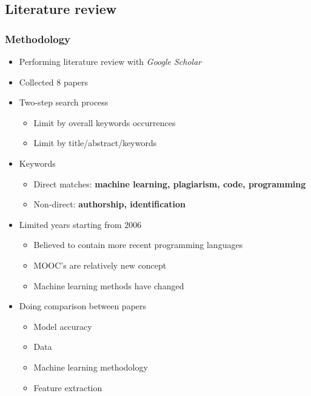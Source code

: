 \documentclass[t,12pt,pdftex]{beamer}
\begin{document}
\subsection{Literature review}


\begin{frame}
	\frametitle{Methodology}
	\begin{itemize}
		\item Performing literature review with \textit{Google Scholar}
		\item Collected 8 papers 
		\item Two-step search process
		\begin{itemize}
			\item Limit by overall keywords occurrences
			\item Limit by title/abstract/keywords
		\end{itemize}
		\item Keywords
		\begin{itemize}
			\item Direct matches: \textbf{machine learning, plagiarism, code, programming}
			\item Non-direct: \textbf{authorship, identification} 
		\end{itemize}
	\end{itemize}
\end{frame}

\begin{frame}
	\vspace{1in}
	\begin{itemize}
		\item Limited years starting from 2006
		\begin{itemize}
			\item Believed to contain more recent programming languages
			\item MOOC's are relatively new concept
			\item Machine learning methods have changed
		\end{itemize}
		\item Doing comparison between papers
		\begin{itemize}
			\item Model accuracy
			\item Data
			\item Machine learning methodology
			\item Feature extraction
		\end{itemize}
	\end{itemize}
\end{frame}
\end{document}
